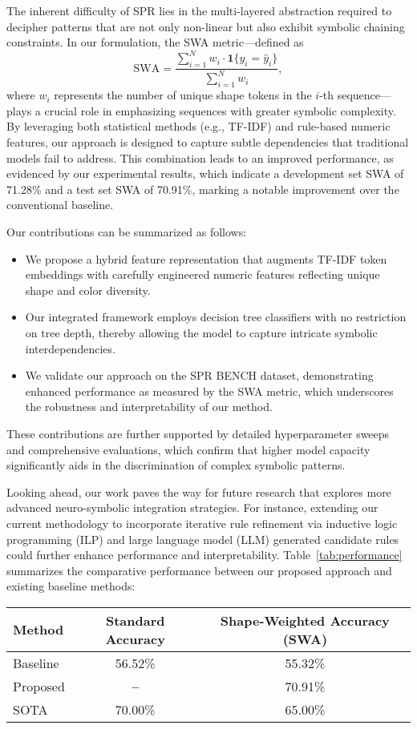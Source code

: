 \documentclass{article}
\begin{document}
The inherent difficulty of SPR lies in the multi-layered abstraction required to decipher patterns that are not only non-linear but also exhibit symbolic chaining constraints. In our formulation, the SWA metric—defined as 
\[
\text{SWA} = \frac{\sum_{i=1}^{N} w_i \cdot \mathbf{1}\{y_i = \hat{y}_i\}}{\sum_{i=1}^{N} w_i},
\]
where \(w_i\) represents the number of unique shape tokens in the \(i\)-th sequence—plays a crucial role in emphasizing sequences with greater symbolic complexity. By leveraging both statistical methods (e.g., TF-IDF) and rule-based numeric features, our approach is designed to capture subtle dependencies that traditional models fail to address. This combination leads to an improved performance, as evidenced by our experimental results, which indicate a development set SWA of 71.28\% and a test set SWA of 70.91\%, marking a notable improvement over the conventional baseline.

Our contributions can be summarized as follows:
\begin{itemize}
    \item We propose a hybrid feature representation that augments TF-IDF token embeddings with carefully engineered numeric features reflecting unique shape and color diversity.
    \item Our integrated framework employs decision tree classifiers with no restriction on tree depth, thereby allowing the model to capture intricate symbolic interdependencies.
    \item We validate our approach on the SPR BENCH dataset, demonstrating enhanced performance as measured by the SWA metric, which underscores the robustness and interpretability of our method.
\end{itemize}
These contributions are further supported by detailed hyperparameter sweeps and comprehensive evaluations, which confirm that higher model capacity significantly aids in the discrimination of complex symbolic patterns.

Looking ahead, our work paves the way for future research that explores more advanced neuro-symbolic integration strategies. For instance, extending our current methodology to incorporate iterative rule refinement via inductive logic programming (ILP) and large language model (LLM) generated candidate rules could further enhance performance and interpretability. Table~\ref{tab:performance} summarizes the comparative performance between our proposed approach and existing baseline methods:

\begin{center}
\begin{tabular}{lcc}
\hline
Method & Standard Accuracy & Shape-Weighted Accuracy (SWA) \\
\hline
Baseline & 56.52\% & 55.32\% \\
Proposed & \textbf{--} & 70.91\% \\
SOTA & 70.00\% & 65.00\% \\
\hline
\end{tabular}
\end{center}
\end{document}
